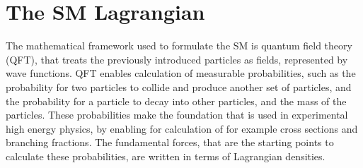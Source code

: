 \section{The SM Lagrangian}
\noindent\justify
The mathematical framework used to formulate the SM is quantum field theory (QFT), that treats the previously introduced particles as fields, represented by wave functions. 
QFT enables calculation of measurable probabilities, such as the probability for two particles to collide and produce another set of particles, and the probability for a particle to decay into other particles, and the mass of the particles. 
These probabilities make the foundation that is used in experimental high energy physics, by enabling for calculation of for example cross sections and branching fractions. 
The fundamental forces, that are the starting points to calculate these probabilities, are written in terms of Lagrangian densities. 
